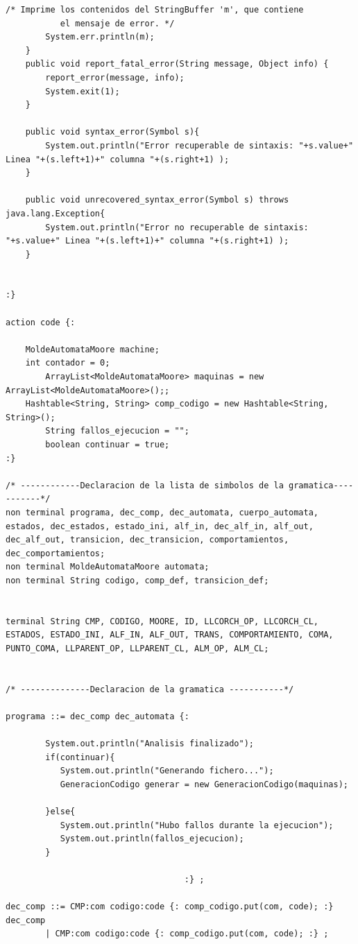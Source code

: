 \documentclass[12pt,a4paper]{article}
\begin{document}
\begin{lstlisting}[caption=Analizador Sintáctico y Semántico en CUP]
        /* Imprime los contenidos del StringBuffer 'm', que contiene
           el mensaje de error. */
        System.err.println(m);
    }
    public void report_fatal_error(String message, Object info) {
        report_error(message, info);
        System.exit(1);
    }

    public void syntax_error(Symbol s){
        System.out.println("Error recuperable de sintaxis: "+s.value+" Linea "+(s.left+1)+" columna "+(s.right+1) );
    }

    public void unrecovered_syntax_error(Symbol s) throws java.lang.Exception{ 
        System.out.println("Error no recuperable de sintaxis: "+s.value+" Linea "+(s.left+1)+" columna "+(s.right+1) );
    }

   
:}

action code {: 

	MoldeAutomataMoore machine;
	int contador = 0;
        ArrayList<MoldeAutomataMoore> maquinas = new ArrayList<MoldeAutomataMoore>();;
	Hashtable<String, String> comp_codigo = new Hashtable<String, String>();
        String fallos_ejecucion = "";
        boolean continuar = true;
:}

/* ------------Declaracion de la lista de simbolos de la gramatica-----------*/
non terminal programa, dec_comp, dec_automata, cuerpo_automata, estados, dec_estados, estado_ini, alf_in, dec_alf_in, alf_out, dec_alf_out, transicion, dec_transicion, comportamientos, dec_comportamientos;
non terminal MoldeAutomataMoore automata;
non terminal String codigo, comp_def, transicion_def;


terminal String CMP, CODIGO, MOORE, ID, LLCORCH_OP, LLCORCH_CL, ESTADOS, ESTADO_INI, ALF_IN, ALF_OUT, TRANS, COMPORTAMIENTO, COMA, PUNTO_COMA, LLPARENT_OP, LLPARENT_CL, ALM_OP, ALM_CL;


/* --------------Declaracion de la gramatica -----------*/

programa ::= dec_comp dec_automata {: 

        System.out.println("Analisis finalizado"); 
        if(continuar){
           System.out.println("Generando fichero...");
           GeneracionCodigo generar = new GeneracionCodigo(maquinas);
           
        }else{
           System.out.println("Hubo fallos durante la ejecucion"); 
           System.out.println(fallos_ejecucion);
        }

                                    :} ;

dec_comp ::= CMP:com codigo:code {: comp_codigo.put(com, code); :} dec_comp
		| CMP:com codigo:code {: comp_codigo.put(com, code); :} ;


\end{lstlisting}
\end{document}
